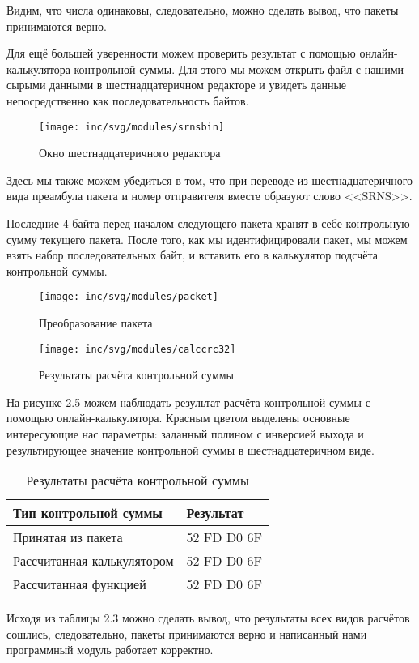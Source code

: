 Видим, что числа одинаковы, следовательно, можно сделать вывод, что пакеты принимаются верно.

Для ещё большей уверенности можем проверить результат с помощью онлайн-калькулятора контрольной суммы. Для этого мы можем открыть файл с нашими сырыми данными в шестнадцатеричном редакторе и увидеть данные непосредственно как последовательность байтов.
\begin{figure}[ht]
	\centering
	\texttt{[image: inc/svg/modules/srnsbin]}
	\caption{Окно шестнадцатеричного редактора}
	\label{fig:srnsbin}
\end{figure}

Здесь мы также можем убедиться в том, что при переводе из шестнадцатеричного вида преамбула пакета и номер отправителя вместе образуют слово <<SRNS>>. 

Последние 4 байта перед началом следующего пакета хранят в себе контрольную сумму текущего пакета. После того, как мы идентифицировали пакет, мы можем взять набор последовательных байт, и вставить его в калькулятор подсчёта контрольной суммы.
\begin{figure}[ht]
	\centering
	\texttt{[image: inc/svg/modules/packet]}
	\caption{Преобразование пакета}
	\label{fig:packet}
\end{figure}
\begin{figure}[ht]
	\centering
	\texttt{[image: inc/svg/modules/calccrc32]}
	\caption{Результаты расчёта контрольной суммы}
	\label{fig:calccrc32}
\end{figure}

На рисунке 2.5 можем наблюдать результат расчёта контрольной суммы с помощью онлайн-калькулятора. Красным цветом выделены основные интересующие нас параметры: заданный полином с инверсией выхода и результирующее значение контрольной суммы в шестнадцатеричном виде.
\begin{longtable}[c]{|p{7cm}|l|}
	\caption{Результаты расчёта контрольной суммы} \label{tab:checksum}\\
	\hline
	Тип контрольной суммы & Результат \\
	\hline
	Принятая из пакета & 52 FD D0 6F \\
	
	 Рассчитанная калькулятором& 52 FD D0 6F  \\
	
	Рассчитанная функцией & 52 FD D0 6F  \\
	\hline
\end{longtable}
Исходя из таблицы 2.3 можно сделать вывод, что результаты всех видов расчётов сошлись, следовательно, пакеты принимаются верно и написанный нами программный модуль работает корректно.

